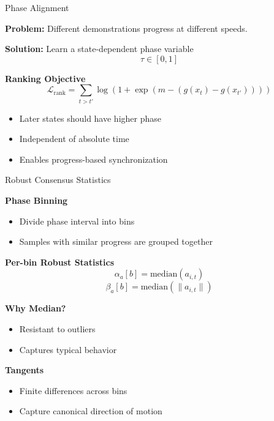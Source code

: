 \begin{frame}{Phase Alignment}

    \textbf{Problem:}
    Different demonstrations progress at different speeds.

    \vspace{0.7em}

    \textbf{Solution:}
    Learn a state-dependent phase variable
    \[
        \tau \in [0,1]
    \]

    \vspace{0.7em}

    \textbf{Ranking Objective}
    \[
        \mathcal{L}_{\mathrm{rank}}
        =
        \sum_{t>t'}
        \log\left(
            1+\exp\left(
                m-(g(x_t)-g(x_{t'}))
            \right)
        \right)
    \]

    \vspace{0.7em}

    \begin{itemize}
        \item Later states should have higher phase
        \item Independent of absolute time
        \item Enables progress-based synchronization
    \end{itemize}

\end{frame}

\begin{frame}{Robust Consensus Statistics}

    \textbf{Phase Binning}
    \begin{itemize}
        \item Divide phase interval into bins
        \item Samples with similar progress are grouped together
    \end{itemize}

    \textbf{Per-bin Robust Statistics}
    \[
        \alpha_a[b] = \mathrm{median}(a_{i,t})
    \]
    \[
        \beta_a[b] = \mathrm{median}(\|a_{i,t}\|)
    \]

    \textbf{Why Median?}
    \begin{itemize}
        \item Resistant to outliers
        \item Captures typical behavior
    \end{itemize}

    \textbf{Tangents}
    \begin{itemize}
        \item Finite differences across bins
        \item Capture canonical direction of motion
    \end{itemize}

\end{frame}

